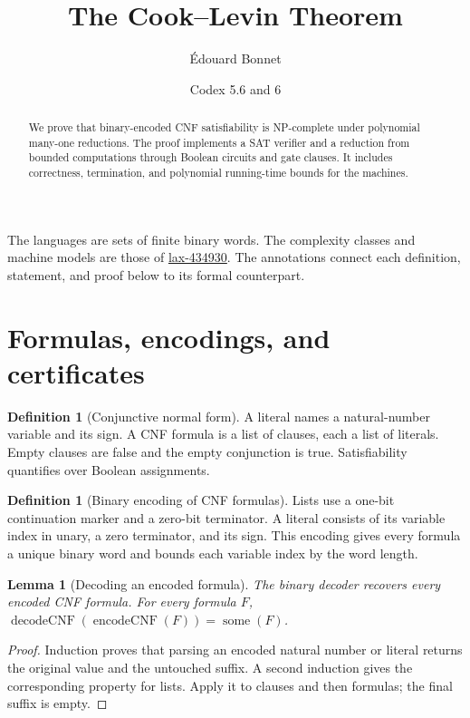 \documentclass[11pt]{article}
\title{The Cook--Levin Theorem}
\author{\'{E}douard Bonnet \and Codex 5.6 and 6}
\date{}
\newtheorem{lemma}[theorem]{Lemma}
\theoremstyle{definition}
\newtheorem{definition}[theorem]{Definition}
\begin{document}
\maketitle
\begin{abstract}
We prove that binary-encoded CNF satisfiability is NP-complete under polynomial many-one reductions. The proof implements a SAT verifier and a reduction from bounded computations through Boolean circuits and gate clauses. It includes correctness, termination, and polynomial running-time bounds for the machines.
\end{abstract}
The languages are sets of finite binary words. The complexity classes and
machine models are those of \href{https://laxarchive.org/lax-434930/}{lax-434930}.
The annotations connect each definition, statement, and proof below to its formal counterpart.

\section{Formulas, encodings, and certificates}

\begin{definition}[Conjunctive normal form]\leavevmode
A literal names a natural-number variable and its sign. A CNF formula is a
list of clauses, each a list of literals. Empty clauses are false and the
empty conjunction is true. Satisfiability quantifies over Boolean assignments.

\end{definition}

\begin{definition}[Binary encoding of CNF formulas]\leavevmode
Lists use a one-bit continuation marker and a zero-bit terminator.
A literal consists of its variable index in unary, a zero terminator, and
its sign. This encoding gives every formula a unique binary word and bounds
each variable index by the word length.

\end{definition}

\begin{lemma}[Decoding an encoded formula]\leavevmode
The binary decoder recovers every encoded CNF formula.
For every formula $F$, $\operatorname{decodeCNF}(\operatorname{encodeCNF}(F))=\operatorname{some}(F)$.
\end{lemma}
\begin{proof}\leavevmode
Induction proves that parsing an encoded natural number or literal returns the original value and the untouched suffix. A second induction gives the corresponding property for lists. Apply it to clauses and then formulas; the final suffix is empty.\qedhere
\end{proof}
\end{document}
